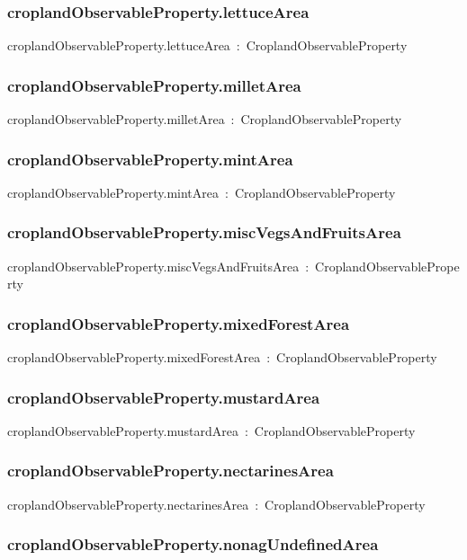 \documentclass{article}
\begin{document}
\subsubsection*{croplandObservableProperty.lettuceArea}

croplandObservableProperty.lettuceArea~:~CroplandObservableProperty

\subsubsection*{croplandObservableProperty.milletArea}

croplandObservableProperty.milletArea~:~CroplandObservableProperty

\subsubsection*{croplandObservableProperty.mintArea}

croplandObservableProperty.mintArea~:~CroplandObservableProperty

\subsubsection*{croplandObservableProperty.miscVegsAndFruitsArea}

croplandObservableProperty.miscVegsAndFruitsArea~:~CroplandObservableProperty

\subsubsection*{croplandObservableProperty.mixedForestArea}

croplandObservableProperty.mixedForestArea~:~CroplandObservableProperty

\subsubsection*{croplandObservableProperty.mustardArea}

croplandObservableProperty.mustardArea~:~CroplandObservableProperty

\subsubsection*{croplandObservableProperty.nectarinesArea}

croplandObservableProperty.nectarinesArea~:~CroplandObservableProperty

\subsubsection*{croplandObservableProperty.nonagUndefinedArea}
\end{document}
